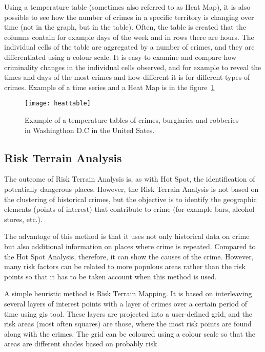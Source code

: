 \documentclass[thesis=M,english]{FITthesis}[2012/10/20]
\begin{document}
Using a temperature table (sometimes also referred to as Heat Map), it is also possible to see how the number of crimes in a specific territory is changing over time (not in the graph, but in the table). Often, the table is created that the columns contain for example days of the week and in rows there are hours. The individual cells of the table are aggregated by a number of crimes, and they are differentiated using a colour scale. It is easy to examine and compare how criminality changes in the individual cells observed, and for example to reveal the times and days of the most crimes and how different it is for different types of crimes.\cite[46--47]{PP13} Example of a time series and a Heat Map is in the figure~\ref{fig:temporal}

\begin{figure}[ht]\centering
    \texttt{[image: heattable]}
    \caption{Example of a temperature tables of crimes, burglaries and robberies in Washingthon D.C in the United Sates.\cite[47]{PP13}}\label{fig:temporal}
\end{figure}

\subsection{Risk Terrain Analysis}

The outcome of Risk Terrain Analysis is, as with Hot Spot, the identification of potentially dangerous places. However, the Risk Terrain Analysis is not based on the clustering of historical crimes, but the objective is to identify the geographic elements (points of interest) that contribute to crime (for example bars, alcohol stores, etc.).\cite[50]{PP13}

The advantage of this method is that it uses not only historical data on crime but also additional information on places where crime is repeated. Compared to the Hot Spot Analysis, therefore, it can show the causes of the crime. However, many risk factors can be related to more populous areas rather than the risk points so that it has to be taken account when this method is used. 

A simple heuristic method is Risk Terrain Mapping.\cite[51]{PP13} It is based on interleaving several layers of interest points with a layer of crimes over a certain period of time using \gls{gis} tool. These layers are projected into a user-defined grid, and the risk areas (most often squares) are those, where the most risk points are found along with the crimes. The grid can be coloured using a colour scale so that the areas are different shades based on probably risk.
\end{document}
